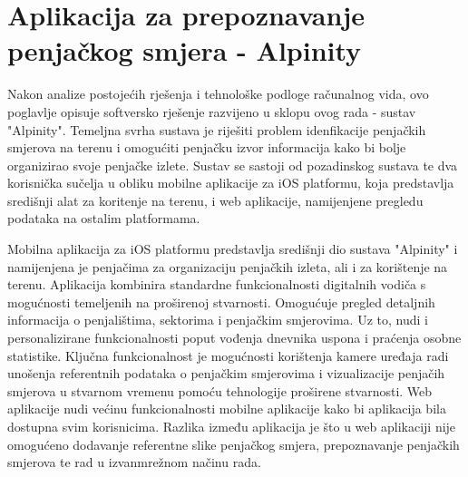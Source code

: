 \chapter{Aplikacija za prepoznavanje penjačkog smjera - Alpinity}

Nakon analize postojećih rješenja i tehnološke podloge računalnog vida, ovo poglavlje opisuje softversko rješenje razvijeno u sklopu ovog rada - sustav "Alpinity". Temeljna svrha sustava je riješiti problem idenfikacije penjačkih smjerova na terenu i omogućiti penjačku izvor informacija kako bi bolje organizirao svoje penjačke izlete. Sustav se sastoji od pozadinskog sustava te dva korisnička sučelja u obliku mobilne aplikacije za iOS platformu, koja predstavlja središnji alat za koritenje na terenu, i web aplikacije, namijenjene pregledu podataka na ostalim platformama. 

Mobilna aplikacija za iOS platformu predstavlja središnji dio sustava "Alpinity" i namijenjena je penjačima za organizaciju penjačkih izleta, ali i za korištenje na terenu. Aplikacija kombinira standardne funkcionalnosti digitalnih vodiča s mogućnosti temeljenih na proširenoj stvarnosti. Omogućuje pregled detaljnih informacija o penjalištima, sektorima i penjačkim smjerovima. Uz to, nudi i personalizirane funkcionalnosti poput vođenja dnevnika uspona i praćenja osobne statistike. 
Ključna funkcionalnost je mogućnosti korištenja kamere uređaja radi unošenja referentnih podataka o penjačkim smjerovima i vizualizacije penjačih smjerova u stvarnom vremenu pomoću tehnologije proširene stvarnosti. Web aplikacije nudi većinu funkcionalnosti mobilne aplikacije kako bi aplikacija bila dostupna svim korisnicima. Razlika između aplikacija je što u web aplikaciji nije omogućeno dodavanje referentne slike penjačkog smjera, prepoznavanje penjačkih smjerova te rad u izvanmrežnom načinu rada. 

% 
% 
% 
% 
% 
% 
% 
% 

% 

